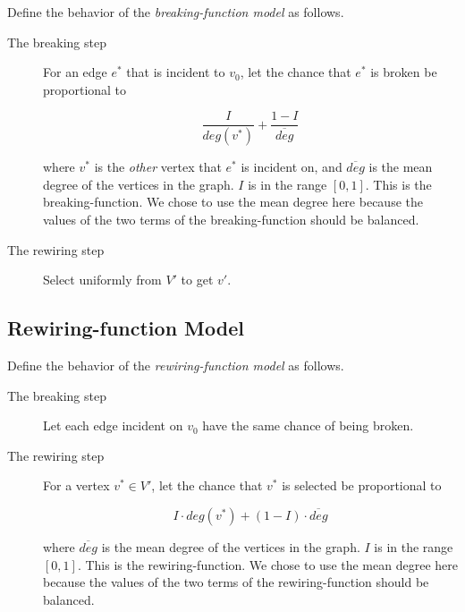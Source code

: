 \documentclass[a4paper,10pt]{article}
\begin{document}
Define the behavior of the \emph{breaking-function model} as follows.

\begin{description}
 \item[The breaking step]

 For an edge $e^*$ that is incident to $v_0$, let the chance that $e^*$ is broken be proportional to

 \begin{equation}
\label{eqn:breaking-function}
  \frac{I}{deg(v^*)} + \frac{1 - I}{\overline{deg}}
 \end{equation}

where $v^*$ is the \emph{other} vertex that $e^*$ is incident on, and $\overline{deg}$ is the mean degree of the vertices in the graph. $I$ is in the range $[0, 1]$. This is the breaking-function. We chose to use the mean degree here because the values of the two terms of the breaking-function should be balanced. 

 \item[The rewiring step] Select uniformly from $V'$ to get $v'$.
\end{description}

\subsection{Rewiring-function Model}

Define the behavior of the \emph{rewiring-function model} as follows.

\begin{description}
 \item[The breaking step] Let each edge incident on $v_0$ have the same chance of being broken.

 \item[The rewiring step] For a vertex $v^* \in V'$, let the chance that $v^*$ is selected be proportional to

 \begin{equation}
\label{eqn:rewiring-function}
  I \cdot deg(v^*) + (1 - I) \cdot \overline{deg}
 \end{equation}

where $\overline{deg}$ is the mean degree of the vertices in the graph. $I$ is in the range $[0, 1]$. This is the rewiring-function. We chose to use the mean degree here because the values of the two terms of the rewiring-function should be balanced. 

\end{description}
\end{document}
